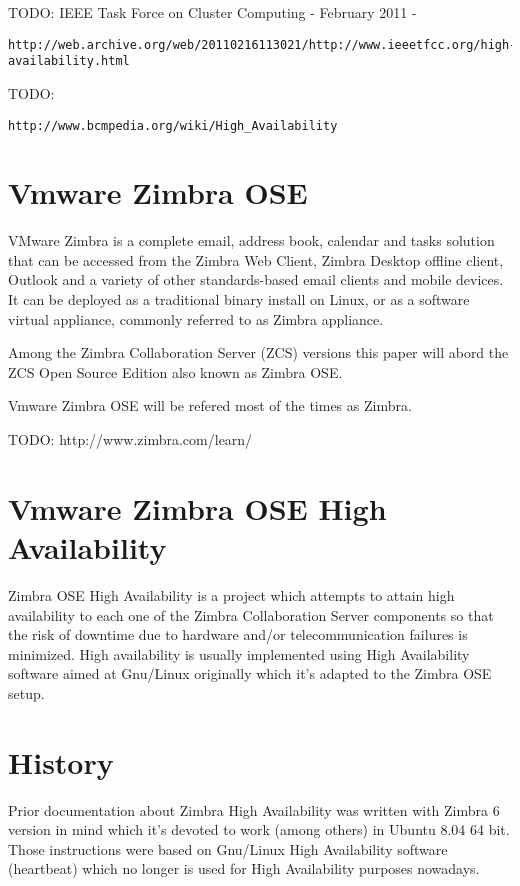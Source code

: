 TODO: IEEE Task Force on Cluster Computing - February 2011 -
\begin{verbatim}
http://web.archive.org/web/20110216113021/http://www.ieeetfcc.org/high-availability.html
\end{verbatim}

TODO:
\begin{verbatim}
http://www.bcmpedia.org/wiki/High_Availability
\end{verbatim}



\section {Vmware Zimbra OSE}
VMware Zimbra is a complete email, address book, calendar and tasks solution that can be accessed from the Zimbra Web Client, Zimbra Desktop offline client, Outlook and a variety of other standards-based email clients and mobile devices. It can be deployed as a traditional binary install on Linux, or as a software virtual appliance, commonly referred to as Zimbra appliance.

Among the Zimbra Collaboration Server (ZCS) versions this paper will abord the ZCS Open Source Edition also known as Zimbra OSE.

Vmware Zimbra OSE will be refered most of the times as Zimbra.

TODO: http://www.zimbra.com/learn/

\section {Vmware Zimbra OSE High Availability}
Zimbra OSE High Availability is a project which attempts to attain high availability to each one of the Zimbra Collaboration Server components so that the risk of downtime due to hardware and/or telecommunication failures is minimized. High availability is usually implemented using High Availability software aimed at Gnu/Linux originally which it's adapted to the Zimbra OSE setup.


\section{History}

Prior documentation about Zimbra High Availability was written with Zimbra 6 version in mind which it's devoted to work (among others) in Ubuntu 8.04 64 bit. Those instructions were based on Gnu/Linux High Availability software (heartbeat) which no longer is used for High Availability purposes nowadays.


